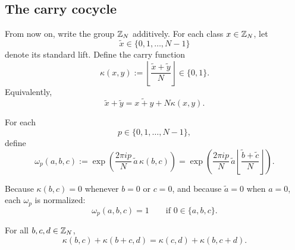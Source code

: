 \subsection{The carry cocycle}

From now on, write the group $\mathbb{Z}_N$ additively. For each class $x\in \mathbb{Z}_N$, let
\begin{equation*}
\widetilde{x}\in \{0,1,\dots,N-1\}
\end{equation*}
denote its standard lift. Define the carry function
\begin{equation}\label{eq:carry-def}
\kappa(x,y)
:=
\left\lfloor \frac{\widetilde{x}+\widetilde{y}}{N}\right\rfloor
\in \{0,1\}.
\end{equation}
Equivalently,
\begin{equation}\label{eq:carry-splitting}
\widetilde{x}+\widetilde{y}
=
\widetilde{x+y}+N\kappa(x,y).
\end{equation}

\begin{definition}\label{def:omega-p}
For each
\begin{equation*}
p\in \{0,1,\dots,N-1\},
\end{equation*}
define
\begin{equation}\label{eq:omega-p}
\omega_p(a,b,c)
:=
\exp\!\left(\frac{2\pi i p}{N}\,\widetilde{a}\,\kappa(b,c)\right)
=
\exp\!\left(\frac{2\pi i p}{N}\,\widetilde{a}\left\lfloor \frac{\widetilde{b}+\widetilde{c}}{N}\right\rfloor\right).
\end{equation}
\end{definition}

\noindent Because $\kappa(b,c)=0$ whenever $b=0$ or $c=0$, and because $\widetilde{a}=0$ when $a=0$, each $\omega_p$ is normalized:
\begin{equation*}
\omega_p(a,b,c)=1
\qquad
\text{if }0\in \{a,b,c\}.
\end{equation*}

\begin{lemma}\label{lem:carry-assoc}
For all $b,c,d\in \mathbb{Z}_N$,
\begin{equation}\label{eq:carry-assoc}
\kappa(b,c)+\kappa(b+c,d)=\kappa(c,d)+\kappa(b,c+d).
\end{equation}
\end{lemma}

